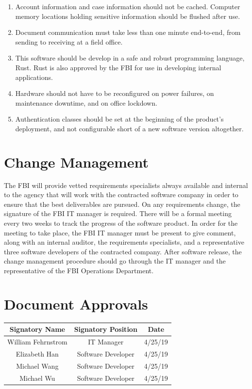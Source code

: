 \documentclass[12pt]{article}
\begin{document}
\begin{enumerate}
    \item Account information and case information should not be cached. Computer memory locations holding
    sensitive information should be flushed after use.
    \item Document communication must take less than one minute end-to-end, from sending to receiving at a
    field office.
    \item This software should be develop in a safe and robust programming language, Rust. Rust is also
    approved by the FBI for use in developing internal applications.
    \item Hardware should not have to be reconfigured on power failures, on maintenance downtime, and on
    office lockdown.
    \item Authentication classes should be set at the beginning of the product’s deployment, and not
    configurable short of a new software version altogether.
\end{enumerate}

\section{Change Management}

The FBI will provide vetted requirements specialists always available and internal to the agency that will
work with the contracted software company in order to ensure that the best deliverables are pursued. On any
requirements change, the signature of the FBI IT manager is required. There will be a formal meeting every
two weeks to track the progress of the software product. In order for the meeting to take place, the FBI IT
manager must be present to give comment, along with an internal auditor, the requirements specialists, and
a representative three software developers of the contracted company. After software release, the change
management procedure should go through the IT manager and the representative of the FBI Operations Department.

\section{Document Approvals}

\begin{center}
    \begin{tabular}{|c|c|c|}
        \hline
        Signatory Name & Signatory Position & Date \\ \hline
        William Fehrnstrom & IT Manager & 4/25/19 \\ \hline
        Elizabeth Han & Software Developer & 4/25/19 \\ \hline
        Michael Wang & Software Developer & 4/25/19 \\ \hline
        Michael Wu & Software Developer & 4/25/19 \\ \hline
    \end{tabular}
\end{center}
\end{document}
